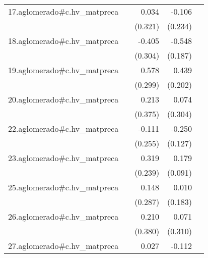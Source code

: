 {\begin{longtable}{l*{4}{D{.}{.}{-1}}}
\addlinespace
17.aglomerado#c.hv\_matpreca&                     &       0.034         &      -0.106         &                     \\
            &                     &     (0.321)         &     (0.234)         &                     \\
\addlinespace
18.aglomerado#c.hv\_matpreca&                     &      -0.405         &      -0.548\sym{**} &                     \\
            &                     &     (0.304)         &     (0.187)         &                     \\
\addlinespace
19.aglomerado#c.hv\_matpreca&                     &       0.578         &       0.439\sym{*}  &                     \\
            &                     &     (0.299)         &     (0.202)         &                     \\
\addlinespace
20.aglomerado#c.hv\_matpreca&                     &       0.213         &       0.074         &                     \\
            &                     &     (0.375)         &     (0.304)         &                     \\
\addlinespace
22.aglomerado#c.hv\_matpreca&                     &      -0.111         &      -0.250\sym{*}  &                     \\
            &                     &     (0.255)         &     (0.127)         &                     \\
\addlinespace
23.aglomerado#c.hv\_matpreca&                     &       0.319         &       0.179\sym{*}  &                     \\
            &                     &     (0.239)         &     (0.091)         &                     \\
\addlinespace
25.aglomerado#c.hv\_matpreca&                     &       0.148         &       0.010         &                     \\
            &                     &     (0.287)         &     (0.183)         &                     \\
\addlinespace
26.aglomerado#c.hv\_matpreca&                     &       0.210         &       0.071         &                     \\
            &                     &     (0.380)         &     (0.310)         &                     \\
\addlinespace
27.aglomerado#c.hv\_matpreca&                     &       0.027         &      -0.112\sym{**} &                     \\

\end{longtable}}
